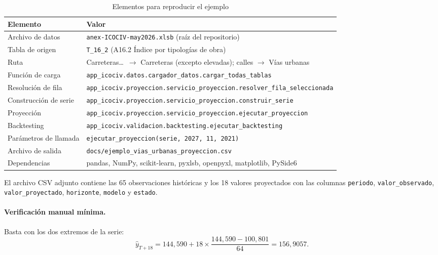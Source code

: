 \documentclass[11pt,letterpaper]{article}
\begin{document}
\begin{table}[H]
\centering
\caption{Elementos para reproducir el ejemplo}
\begin{tabular}{@{}p{4.6cm}p{10.4cm}@{}}
\toprule
\textbf{Elemento} & \textbf{Valor} \\
\midrule
Archivo de datos & \texttt{anex-ICOCIV-may2026.xlsb} (raíz del repositorio) \\
Tabla de origen & \texttt{T\_16\_2} (A16.2 Índice por tipologías de obra) \\
Ruta & Carreteras\dots\ $\rightarrow$ Carreteras (excepto elevadas); calles $\rightarrow$ Vías urbanas \\
Función de carga & \texttt{app\_icociv.datos.cargador\_datos.cargar\_todas\_tablas} \\
Resolución de fila & \texttt{app\_icociv.proyeccion.servicio\_proyeccion.resolver\_fila\_seleccionada} \\
Construcción de serie & \texttt{app\_icociv.proyeccion.servicio\_proyeccion.construir\_serie} \\
Proyección & \texttt{app\_icociv.proyeccion.servicio\_proyeccion.ejecutar\_proyeccion} \\
Backtesting & \texttt{app\_icociv.validacion.backtesting.ejecutar\_backtesting} \\
Parámetros de llamada & \texttt{ejecutar\_proyeccion(serie, 2027, 11, 2021)} \\
Archivo de salida & \texttt{docs/ejemplo\_vias\_urbanas\_proyeccion.csv} \\
Dependencias & pandas, NumPy, scikit-learn, pyxlsb, openpyxl, matplotlib, PySide6 \\
\bottomrule
\end{tabular}
\end{table}

El archivo CSV adjunto contiene las 65 observaciones históricas y los 18
valores proyectados con las columnas \texttt{periodo},
\texttt{valor\_observado}, \texttt{valor\_proyectado}, \texttt{horizonte},
\texttt{modelo} y \texttt{estado}.

\paragraph{Verificación manual mínima.} Basta con los dos extremos de la serie:
\begin{equation}
\hat y_{T+18}=144{,}590+18\times\frac{144{,}590-100{,}801}{64}=156{,}9057 .
\end{equation}
\end{document}
